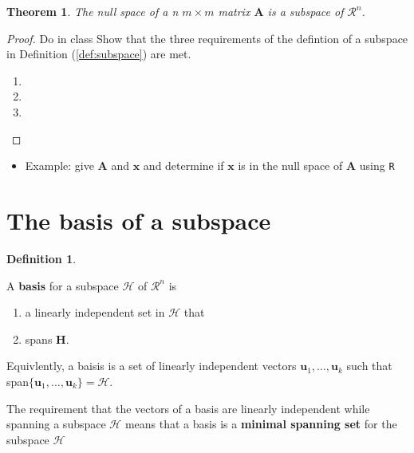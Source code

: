 \documentclass[
]{book}
\providecommand{\tightlist}{%
  \setlength{\itemsep}{0pt}\setlength{\parskip}{0pt}}
\newtheorem{theorem}{Theorem}[chapter]
\theoremstyle{definition}
\newtheorem{definition}{Definition}[chapter]
\theoremstyle{definition}
\theoremstyle{definition}
\theoremstyle{remark}
\begin{document}
\begin{theorem}
\protect\hypertarget{thm:unnamed-chunk-171}{}{\label{thm:unnamed-chunk-171} }The null space of a n \(m \times m\) matrix \(\mathbf{A}\) is a subspace of \(\mathcal{R}^n\).
\end{theorem}

\begin{proof}

Do in class
Show that the three requirements of the defintion of a subspace in Definition (\ref{def:subspace}) are met.

\begin{enumerate}
\def\labelenumi{\arabic{enumi})}
\item
\item
\item
\end{enumerate}

\end{proof}

\begin{itemize}
\tightlist
\item
  Example: give \(\mathbf{A}\) and \(\mathbf{x}\) and determine if \(\mathbf{x}\) is in the null space of \(\mathbf{A}\) using \texttt{R}
\end{itemize}

\hypertarget{the-basis-of-a-subspace}{%
\section{The basis of a subspace}\label{the-basis-of-a-subspace}}

\begin{definition}
\protect\hypertarget{def:basis}{}\label{def:basis}

A \textbf{basis} for a subspace \(\mathcal{H}\) of \(\mathcal{R}^n\) is

\begin{enumerate}
\def\labelenumi{\arabic{enumi})}
\tightlist
\item
  a linearly independent set in \(\mathcal{H}\) that
\item
  spans \(\mathbf{H}\).
\end{enumerate}

Equivlently, a baisis is a set of linearly independent vectors \(\mathbf{u}_1, \ldots, \mathbf{u}_k\) such that span\(\{\mathbf{u}_1, \ldots, \mathbf{u}_k\} = \mathcal{H}\).

\end{definition}

The requirement that the vectors of a basis are linearly independent while spanning a subspace \(\mathcal{H}\) means that a basis is a \textbf{minimal spanning set} for the subspace \(\mathcal{H}\)
\end{document}
